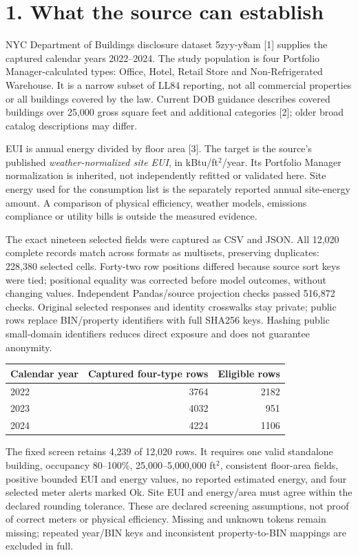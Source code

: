 \documentclass[10pt,letterpaper]{article}
\begin{document}
\newpage
\section*{1. What the source can establish}
NYC Department of Buildings disclosure dataset 5zyy-y8am [1] supplies the captured calendar years 2022--2024. The study population is four Portfolio Manager-calculated types: Office, Hotel, Retail Store and Non-Refrigerated Warehouse. It is a narrow subset of LL84 reporting, not all commercial properties or all buildings covered by the law. Current DOB guidance describes covered buildings over 25,000 gross square feet and additional categories [2]; older broad catalog descriptions may differ.

EUI is annual energy divided by floor area [3]. The target is the source's published \emph{weather-normalized site EUI}, in kBtu/ft$^2$/year. Its Portfolio Manager normalization is inherited, not independently refitted or validated here. Site energy used for the consumption list is the separately reported annual site-energy amount. A comparison of physical efficiency, weather models, emissions compliance or utility bills is outside the measured evidence.

The exact nineteen selected fields were captured as CSV and JSON. All 12,020 complete records match across formats as multisets, preserving duplicates: 228,380 selected cells. Forty-two row positions differed because source sort keys were tied; positional equality was corrected before model outcomes, without changing values. Independent Pandas/source projection checks passed 516,872 checks. Original selected responses and identity crosswalks stay private; public rows replace BIN/property identifiers with full SHA256 keys. Hashing public small-domain identifiers reduces direct exposure and does not guarantee anonymity.

\begin{center}\small\begin{tabular}{lrr}\toprule
Calendar year & Captured four-type rows & Eligible rows\\\midrule
2022 & 3764 & 2182 \\
2023 & 4032 & 951 \\
2024 & 4224 & 1106 \\
\bottomrule\end{tabular}\end{center}

The fixed screen retains 4,239 of 12,020 rows. It requires one valid standalone building, occupancy 80--100\%, 25,000--5,000,000 ft$^2$, consistent floor-area fields, positive bounded EUI and energy values, no reported estimated energy, and four selected meter alerts marked Ok. Site EUI and energy/area must agree within the declared rounding tolerance. These are declared screening assumptions, not proof of correct meters or physical efficiency. Missing and unknown tokens remain missing; repeated year/BIN keys and inconsistent property-to-BIN mappings are excluded in full.
\end{document}
